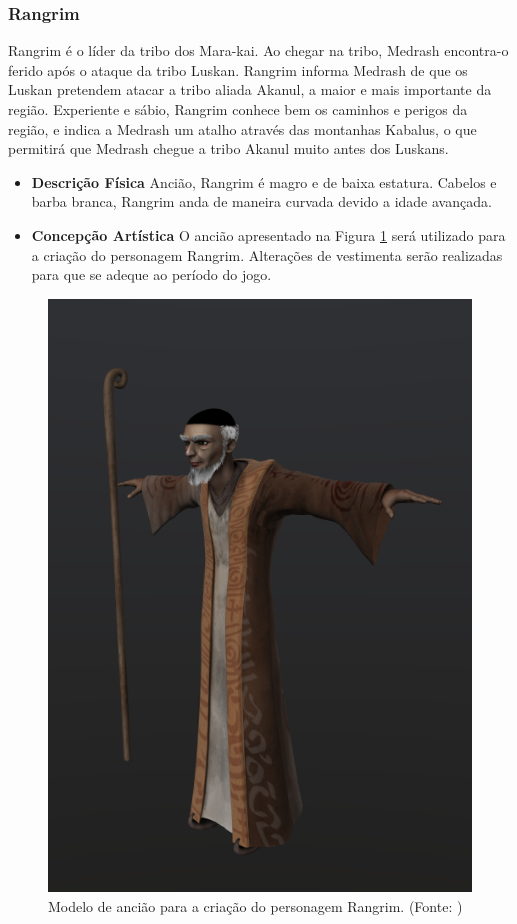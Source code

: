 \subsubsection{Rangrim}
Rangrim é o líder da tribo dos Mara-kai. Ao chegar na tribo, Medrash
 encontra-o ferido após o ataque da tribo Luskan. Rangrim informa Medrash de
 que os Luskan pretendem atacar a tribo aliada Akanul, a maior e mais
 importante da região. Experiente e sábio, Rangrim conhece bem os caminhos
 e perigos da região, e indica a Medrash um atalho através das montanhas
 Kabalus, o que permitirá que Medrash chegue a tribo Akanul muito antes dos
 Luskans.
\begin{itemize}
\item {\bf Descrição Física}
Ancião, Rangrim é magro e de baixa estatura. Cabelos e barba branca,
 Rangrim anda de maneira curvada devido a idade avançada.
\item {\bf Concepção Artística}
O ancião apresentado na Figura \ref{img:rangrim} será utilizado para a criação
 do personagem Rangrim. Alterações de vestimenta serão realizadas para que
 se adeque ao período do jogo.

\end{itemize}
\begin{figure}[H]
 \centering
 \includegraphics[scale=0.5]{Imagens/rangrim01.png}
 \caption{Modelo de ancião para a criação do personagem Rangrim. (Fonte: \cite{bib:rangrim01})}
\label{img:rangrim}
\end{figure}

